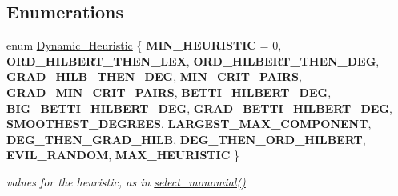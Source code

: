 \subsection*{Enumerations}
\begin{DoxyCompactItemize}
\item 
enum \hyperlink{group___g_b_computation_ga819b1fd40d9a40ff303df3b90647ecb0}{Dynamic\+\_\+\+Heuristic} \{ \newline
{\bfseries M\+I\+N\+\_\+\+H\+E\+U\+R\+I\+S\+T\+IC} = 0, 
{\bfseries O\+R\+D\+\_\+\+H\+I\+L\+B\+E\+R\+T\+\_\+\+T\+H\+E\+N\+\_\+\+L\+EX}, 
{\bfseries O\+R\+D\+\_\+\+H\+I\+L\+B\+E\+R\+T\+\_\+\+T\+H\+E\+N\+\_\+\+D\+EG}, 
{\bfseries G\+R\+A\+D\+\_\+\+H\+I\+L\+B\+\_\+\+T\+H\+E\+N\+\_\+\+D\+EG}, 
\newline
{\bfseries M\+I\+N\+\_\+\+C\+R\+I\+T\+\_\+\+P\+A\+I\+RS}, 
{\bfseries G\+R\+A\+D\+\_\+\+M\+I\+N\+\_\+\+C\+R\+I\+T\+\_\+\+P\+A\+I\+RS}, 
{\bfseries B\+E\+T\+T\+I\+\_\+\+H\+I\+L\+B\+E\+R\+T\+\_\+\+D\+EG}, 
{\bfseries B\+I\+G\+\_\+\+B\+E\+T\+T\+I\+\_\+\+H\+I\+L\+B\+E\+R\+T\+\_\+\+D\+EG}, 
\newline
{\bfseries G\+R\+A\+D\+\_\+\+B\+E\+T\+T\+I\+\_\+\+H\+I\+L\+B\+E\+R\+T\+\_\+\+D\+EG}, 
{\bfseries S\+M\+O\+O\+T\+H\+E\+S\+T\+\_\+\+D\+E\+G\+R\+E\+ES}, 
{\bfseries L\+A\+R\+G\+E\+S\+T\+\_\+\+M\+A\+X\+\_\+\+C\+O\+M\+P\+O\+N\+E\+NT}, 
{\bfseries D\+E\+G\+\_\+\+T\+H\+E\+N\+\_\+\+G\+R\+A\+D\+\_\+\+H\+I\+LB}, 
\newline
{\bfseries D\+E\+G\+\_\+\+T\+H\+E\+N\+\_\+\+O\+R\+D\+\_\+\+H\+I\+L\+B\+E\+RT}, 
{\bfseries E\+V\+I\+L\+\_\+\+R\+A\+N\+D\+OM}, 
{\bfseries M\+A\+X\+\_\+\+H\+E\+U\+R\+I\+S\+T\+IC}
 \}\begin{DoxyCompactList}\small\item\em values for the heuristic, as in {\ttfamily \hyperlink{group___g_b_computation_gaa01d88c431b84deabf51ee116d7d2a0e}{select\+\_\+monomial()}} \end{DoxyCompactList}
\end{DoxyCompactItemize}
